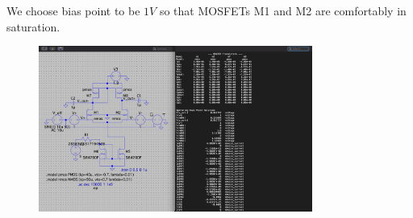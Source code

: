 \documentclass[12pt,a4paper]{article}
\begin{document}
We choose bias point to be $1V$ so that MOSFETs M1 and M2 are comfortably in saturation.
\begin{figure}[H]
    \centering
    \includegraphics[width=0.8\textwidth]{figs/op.png}
\end{figure}
\vspace{6pt}
\end{document}
